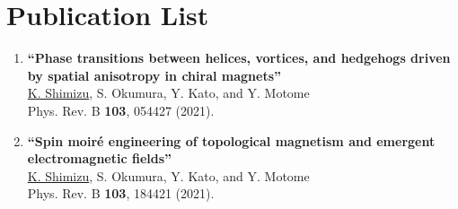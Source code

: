 \chapter*{Publication List}
{\large
\begin{enumerate}
\item {\bf ``Phase transitions between helices, vortices, and hedgehogs driven by spatial anisotropy in chiral magnets''}\\
\underline{K. Shimizu}, S. Okumura, Y. Kato, and Y. Motome\\
Phys. Rev. B \textbf{103}, 054427 (2021).
\vspace{0.5cm}
\item {\bf ``Spin moir\'e engineering of topological magnetism and emergent electromagnetic fields''}\\
\underline{K. Shimizu}, S. Okumura, Y. Kato, and Y. Motome\\
Phys. Rev. B \textbf{103}, 184421 (2021).
\end{enumerate}
}

